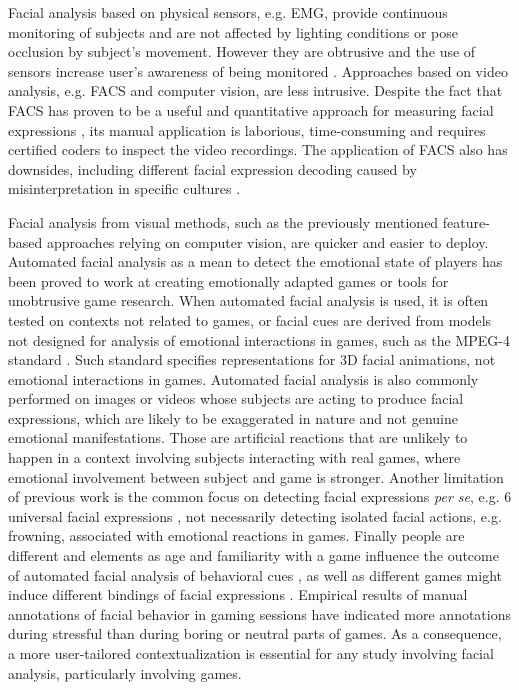 Facial analysis based on physical sensors, e.g. EMG, provide continuous monitoring of subjects and are not affected by lighting conditions or pose occlusion by subject's movement. However they are obtrusive and the use of sensors increase user's awareness of being monitored \parencite{yamakoshi2007preliminary,yamaguchi2006evaluation,healey2005detecting}. Approaches based on video analysis, e.g. FACS and computer vision, are less intrusive. Despite the fact that FACS has proven to be a useful and quantitative approach for measuring facial expressions \parencite{bartlett1999measuring}, its manual application is laborious, time-consuming and requires certified coders to inspect the video recordings. The application of FACS also has downsides, including different facial expression decoding caused by misinterpretation in specific cultures \parencite{jack2013culture}.

Facial analysis from visual methods, such as the previously mentioned feature-based approaches relying on computer vision, are quicker and easier to deploy. Automated facial analysis as a mean to detect the emotional state of players has been proved to work at creating emotionally adapted games \parencite{saari2004towards} or tools for unobtrusive game research. When automated facial analysis is used, it is often tested on contexts not related to games, or facial cues are derived from models not designed for analysis of emotional interactions in games, such as the MPEG-4 standard \parencite{abrantes1999mpeg}. Such standard specifies representations for 3D facial animations, not emotional interactions in games. Automated facial analysis is also commonly performed on images or videos whose subjects are acting to produce facial expressions, which are likely to be exaggerated in nature and not genuine emotional manifestations. Those are artificial reactions that are unlikely to happen in a context involving subjects interacting with real games, where emotional involvement between subject and game is stronger. Another limitation of previous work is the common focus on detecting facial expressions \textit{per se}, e.g. 6 universal facial expressions \parencite{ekman1971constants}, not necessarily detecting isolated facial actions, e.g. frowning, associated with emotional reactions in games. Finally people are different and elements as age and familiarity with a game influence the outcome of automated facial analysis of behavioral cues \parencite{asteriadis2012towards}, as well as different games might induce different bindings of facial expressions \parencite{tan2014correlation}. Empirical results of manual annotations of facial behavior in gaming sessions have indicated more annotations during stressful than during boring \parencite{bevilacqua2016variations} or neutral \parencite{kaiser1994multi} parts of games. As a consequence, a more user-tailored contextualization is essential for any study involving facial analysis, particularly involving games.

